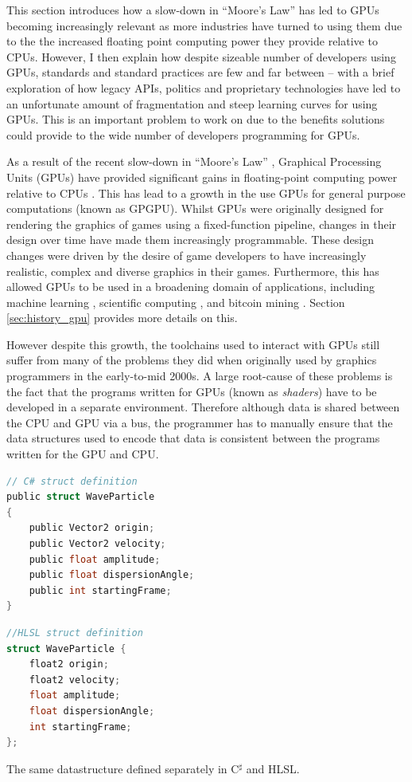 \documentclass[a4paper,12pt,twoside,openright]{report}
\begin{document}
This section introduces how a slow-down in ``Moore's Law'' has led to GPUs
becoming increasingly relevant as more industries have turned to using them due
to the the increased floating point computing power they provide relative to
CPUs. However, I then explain how despite sizeable number of developers using
GPUs, standards and standard practices are few and far between -- with a brief
exploration of how legacy APIs, politics and proprietary technologies have led
to an unfortunate amount of fragmentation and steep learning curves for using
GPUs. This is an important problem to work on due to the benefits solutions
could provide to the wide number of developers programming for GPUs.

As a result of the recent slow-down in ``Moore's Law'' \cite{MooreLawSlowdown},
Graphical Processing Units (GPUs) have provided significant gains in
floating-point computing power relative to CPUs \cite{CPUGPUOverTime}. This has
lead to a growth in the use GPUs for general purpose computations (known as
GPGPU). Whilst GPUs were originally designed for rendering the graphics of
games using a fixed-function pipeline, changes in their design over time have
made them increasingly programmable. These design changes were driven by the
desire of game developers to have increasingly realistic, complex and diverse
graphics in their games. Furthermore, this has allowed GPUs to be used in a
broadening domain of applications, including machine learning \cite{TODO},
scientific computing \cite{TODO}, and bitcoin mining \cite{TODO}. Section
\ref{sec:history_gpu} provides more details on this.

However despite this growth, the toolchains used to interact with GPUs still
suffer from many of the problems they did when originally used by graphics
programmers in the early-to-mid 2000s. A large root-cause of these problems is
the fact that the programs written for GPUs (known as \textit{shaders}) have to
be developed in a separate environment. Therefore although data is shared
between the CPU and GPU via a bus, the programmer has to manually ensure that
the data structures used to encode that data is consistent between the programs
written for the GPU and CPU.

\begin{lstfloat}
\begin{lstlisting}[language=C]
// C# struct definition
public struct WaveParticle
{
    public Vector2 origin;
    public Vector2 velocity;
    public float amplitude;
    public float dispersionAngle;
    public int startingFrame;
}
\end{lstlisting}
\begin{lstlisting}[language=C]
//HLSL struct definition
struct WaveParticle {
    float2 origin;
    float2 velocity;
    float amplitude;
    float dispersionAngle;
    int startingFrame;
};
\end{lstlisting}
\label{lst:c_sharp_hlsl_struct_comparison}
\caption{The same datastructure defined separately in C$^\sharp$ and HLSL.}
\end{lstfloat}
\end{document}
